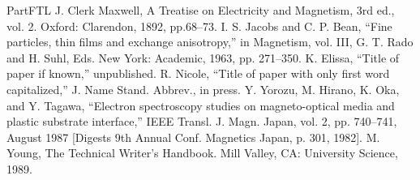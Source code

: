 \documentclass[conference]{IEEEtran}
\begin{document}
\begin{thebibliography}{00}

 PartFTL
 J. Clerk Maxwell, A Treatise on Electricity and Magnetism, 3rd ed., vol. 2. Oxford: Clarendon, 1892, pp.68--73.
 I. S. Jacobs and C. P. Bean, ``Fine particles, thin films and exchange anisotropy,'' in Magnetism, vol. III, G. T. Rado and H. Suhl, Eds. New York: Academic, 1963, pp. 271--350.
 K. Elissa, ``Title of paper if known,'' unpublished.
 R. Nicole, ``Title of paper with only first word capitalized,'' J. Name Stand. Abbrev., in press.
 Y. Yorozu, M. Hirano, K. Oka, and Y. Tagawa, ``Electron spectroscopy studies on magneto-optical media and plastic substrate interface,'' IEEE Transl. J. Magn. Japan, vol. 2, pp. 740--741, August 1987 [Digests 9th Annual Conf. Magnetics Japan, p. 301, 1982].
 M. Young, The Technical Writer's Handbook. Mill Valley, CA: University Science, 1989.
\end{thebibliography}
\end{document}
